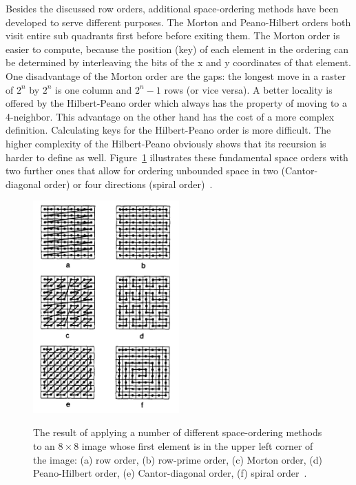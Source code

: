 Besides the discussed row orders, additional space-ordering methods have been developed to serve different purposes. The Morton and Peano-Hilbert orders both visit entire sub quadrants first before before exiting them. The Morton order is easier to compute, because the position (key) of each element in the ordering can be determined by interleaving the bits of the x and y coordinates of that element. One disadvantage of the Morton order are the gaps: the longest move in a raster of $2^n$ by $2^n$ is one column and $2^n - 1$ rows (or vice versa). A better locality is offered by the Hilbert-Peano order which always has the property of moving to a 4-neighbor. This advantage on the other hand has the cost of a more complex definition. Calculating keys for the Hilbert-Peano order is more difficult. The higher complexity of the Hilbert-Peano obviously shows that its recursion is harder to define as well. Figure~\ref{fig:space-orders} illustrates these fundamental space orders with two further ones that allow for ordering unbounded space in two (Cantor-diagonal order) or four directions (spiral order)~\cite{Samet90spatialdata}.

\begin{figure}[h]
  \begin{center}
    \includegraphics[width=0.5\textwidth]{figures/space_orders.png}
    \label{fig:space-orders}
    \caption{The result of applying a number of different space-ordering methods to an $8 \times 8$ image whose first element is in the upper left corner of the image: (a) row order, (b) row-prime order, (c) Morton order, (d) Peano-Hilbert order, (e) Cantor-diagonal order, (f) spiral order~\cite[p 14]{Samet90spatialdata}.}
  \end{center}
\end{figure}

